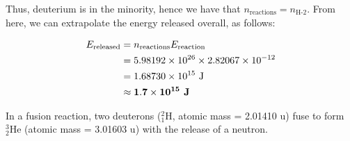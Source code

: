 \documentclass[a4paper, 12pt, addpoints]{exam}
\begin{document}
\begin{questions}
\begin{tcolorbox}
Thus, deuterium is in the minority, hence we have that $n_\text{reactions} = n_\text{H-2}$. From here, we can extrapolate the energy released overall, as follows:

\begin{align*}
E_\text{released} &= n_\text{reactions} E_\text{reaction} \\
&= 5.98192 \times 10^{26} \times 2.82067\times 10^{-12} \\
&= 1.68730 \times 10^{15}\text{ J} \\
&\approx \bf{1.7 \times 10^{15}}\textbf{ J}
\end{align*}
\end{tcolorbox}

\question In a fusion reaction, two deuterons (${}^2_1\text{H}$, atomic mass = 2.01410 u) fuse to form ${}^3_2\text{He}$ (atomic mass = 3.01603 u) with the release of a neutron.
\end{questions}
\end{document}

